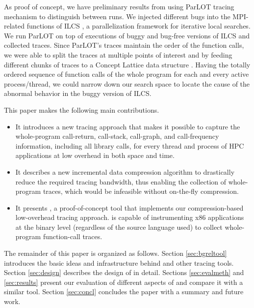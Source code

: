 %
As proof of concept, we have preliminary results from using ParLOT tracing mechanism to distinguish between runs.
%
We injected different bugs into the MPI-related functions of ILCS \cite{ilcs} , a parallelization framework for iterative local searches.
%
We run ParLOT on top of executions of buggy and bug-free versions of ILCS and collected traces.
%
Since ParLOT's traces maintain the order of the function calls, we were able to split the traces at multiple points of interest and by feeding different chunks of traces to a Concept Lattice data structure \cite{clbook} \cite{clconst}. 
%
Having the totally ordered sequence of function calls of the whole program for each and every active process/thread, we could narrow down our search space to locate the cause of the abnormal behavior in the buggy version of ILCS. 

%
This paper makes the following main contributions.
%
\begin{itemize}
\item It introduces a new tracing approach that makes it possible to capture the whole-program call-return, call-stack, call-graph, and call-frequency information, including all library calls, for every thread and process of HPC applications at low overhead in both space and time.
\item It describes a new incremental data compression algorithm to drastically reduce the required tracing bandwidth, thus enabling the collection of whole-program traces, which would be infeasible without on-the-fly compression.
\item It presents \parlot, a proof-of-concept tool that implements our compression-based low-overhead tracing approach. \parlot is capable of instrumenting x86 applications at the binary level (regardless of the source language used) to collect whole-program function-call traces.
\end{itemize}
%
The remainder of this paper is organized as follows. Section \ref{sec:bgreltool} introduces the basic ideas and infrastructure behind \parlot and other tracing tools. Section \ref{sec:design} describes the design of \parlot in detail. Sections \ref{sec:evalmeth} and \ref{sec:results} present our evaluation of different aspects of \parlot and compare it with a similar tool. Section \ref{sec:concl}
concludes the paper with a summary and future work.





